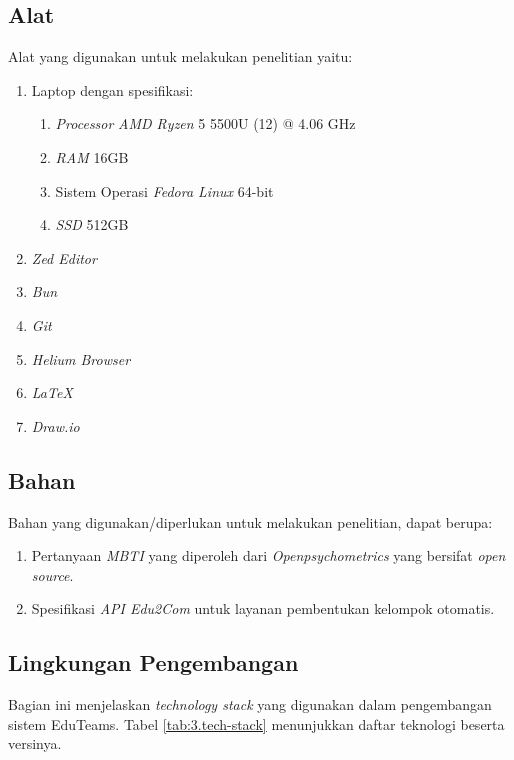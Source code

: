 \subsection{Alat}
Alat yang digunakan untuk melakukan penelitian yaitu: \par
\begin{enumerate}[noitemsep]
	\item Laptop dengan spesifikasi:
	      \begin{enumerate}[noitemsep]
		      \item \textit{Processor} \textit{AMD Ryzen} 5 5500U (12) @ 4.06 GHz
		      \item \textit{RAM} 16GB
		      \item Sistem Operasi \textit{Fedora Linux} 64-bit
		      \item \textit{SSD} 512GB
	      \end{enumerate}
	\item \textit{Zed Editor}
	\item \textit{Bun}
	\item \textit{Git}
	\item \textit{Helium Browser}
	\item \textit{LaTeX}
	\item \textit{Draw.io}
\end{enumerate}

\subsection{Bahan}
Bahan yang digunakan/diperlukan untuk melakukan penelitian, dapat berupa: \par
\begin{enumerate}[noitemsep]
	\item Pertanyaan \textit{MBTI} yang diperoleh dari \textit{Openpsychometrics} yang bersifat \textit{open source}.
	\item Spesifikasi \textit{API Edu2Com} untuk layanan pembentukan kelompok otomatis.
\end{enumerate}

\subsection{Lingkungan Pengembangan}
Bagian ini menjelaskan \textit{technology stack} yang digunakan dalam pengembangan sistem EduTeams. Tabel \ref{tab:3.tech-stack} menunjukkan daftar teknologi beserta versinya.


